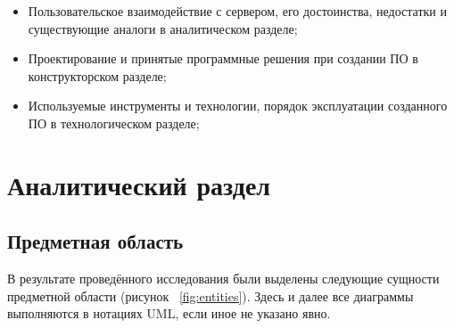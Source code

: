 \documentclass[a4paper,12pt]{report}
\begin{document}
\begin{itemize}
	\item Пользовательское взаимодействие с сервером, его достоинства, недостатки и существующие аналоги в аналитическом разделе;
	\item Проектирование и принятые программные решения при создании ПО в конструкторском разделе;
	\item Используемые инструменты и технологии, порядок эксплуатации созданного ПО в технологическом разделе;
\end{itemize}




\chapter{Аналитический раздел}

\section{Предметная область}

В результате проведённого исследования были выделены следующие сущности предметной области (рисунок ~\ref{fig:entities}). Здесь и далее все диаграммы выполняются в нотациях UML, если иное не указано явно.
\end{document}
